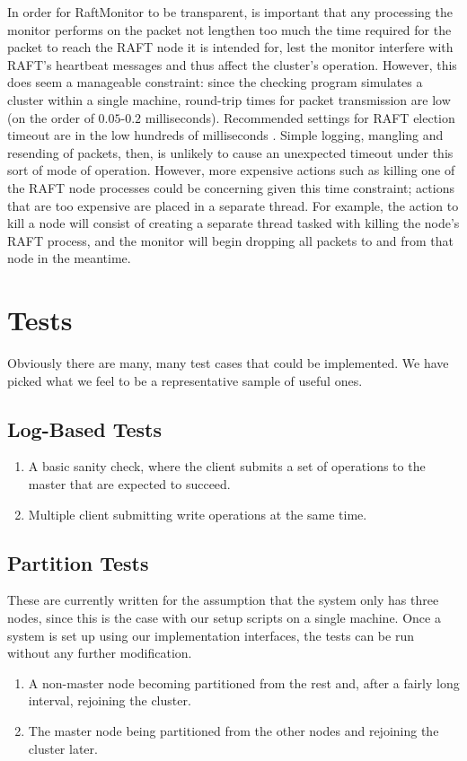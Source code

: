 \documentclass[UTF8]{article}
\begin{document}
In order for RaftMonitor to be transparent, is important that any processing the monitor performs on the packet not lengthen too much the time required for the packet to reach the RAFT node it is intended for, lest the monitor interfere with RAFT's heartbeat messages and thus affect the cluster's operation. However, this does seem a manageable constraint: since the checking program simulates a cluster within a single machine, round-trip times for packet transmission are low (on the order of $0.05$-$0.2$ milliseconds). Recommended settings for RAFT election timeout are in the low hundreds of milliseconds \cite{raftPaper}. Simple logging, mangling and resending of packets, then, is unlikely to cause an unexpected timeout under this sort of mode of operation. However, more expensive actions such as killing one of the RAFT node processes could be concerning given this time constraint; actions that are too expensive are placed in a separate thread. For example, the action to kill a node will consist of creating a separate thread tasked with killing the node's RAFT process, and the monitor will begin dropping all packets to and from that node in the meantime.

\section{Tests}
Obviously there are many, many test cases that could be implemented. We have picked what we feel to be a representative sample of useful ones.
\subsection{Log-Based Tests}
\begin{enumerate}
  \item A basic sanity check, where the client submits a set of operations to the master that are expected to succeed.
  \item Multiple client submitting write operations at the same time.
\end{enumerate}
\subsection{Partition Tests}
These are currently written for the assumption that the system only has three nodes, since this is the case with our setup scripts on a single machine. Once a system is set up using our implementation interfaces, the tests can be run without any further modification. 
\begin{enumerate}
  \item A non-master node becoming partitioned from the rest and, after a fairly long interval, rejoining the cluster.
  \item The master node being partitioned from the other nodes and rejoining the cluster later.
\end{enumerate}
\end{document}
